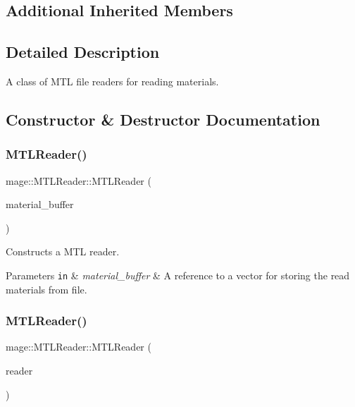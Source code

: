 \subsection*{Additional Inherited Members}


\subsection{Detailed Description}
A class of M\+TL file readers for reading materials. 

\subsection{Constructor \& Destructor Documentation}
\hypertarget{classmage_1_1_m_t_l_reader_a924f813cca170e2592a6e7d2a3255be8}{}\label{classmage_1_1_m_t_l_reader_a924f813cca170e2592a6e7d2a3255be8} 
\subsubsection{\texorpdfstring{M\+T\+L\+Reader()}{MTLReader()}\hspace{0.1cm}{\footnotesize\ttfamily [1/3]}}
{\footnotesize\ttfamily mage\+::\+M\+T\+L\+Reader\+::\+M\+T\+L\+Reader (\begin{DoxyParamCaption}\item[{vector$<$ \hyperlink{classmage_1_1_material}{Material} $>$ \&}]{material\+\_\+buffer }\end{DoxyParamCaption})\hspace{0.3cm}{\ttfamily [explicit]}}

Constructs a M\+TL reader.


\begin{DoxyParams}[1]{Parameters}
\mbox{\tt in}  & {\em material\+\_\+buffer} & A reference to a vector for storing the read materials from file. \\
\hline
\end{DoxyParams}
\hypertarget{classmage_1_1_m_t_l_reader_adcc57156298b2198c24c041503df2e6d}{}\label{classmage_1_1_m_t_l_reader_adcc57156298b2198c24c041503df2e6d} 
\subsubsection{\texorpdfstring{M\+T\+L\+Reader()}{MTLReader()}\hspace{0.1cm}{\footnotesize\ttfamily [2/3]}}
{\footnotesize\ttfamily mage\+::\+M\+T\+L\+Reader\+::\+M\+T\+L\+Reader (\begin{DoxyParamCaption}\item[{const \hyperlink{classmage_1_1_m_t_l_reader}{M\+T\+L\+Reader} \&}]{reader }\end{DoxyParamCaption})\hspace{0.3cm}{\ttfamily [delete]}}

